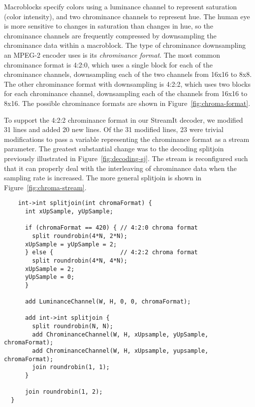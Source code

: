 
Macroblocks specify colors using a luminance channel to represent
saturation (color intensity), and two chrominance channels to
represent hue. The human eye is more sensitive to changes in
saturation than changes in hue, so the chrominance channels are
frequently compressed by downsampling the chrominance data within a
macroblock. The type of chrominance downsampling an MPEG-2 encoder
uses is its {\it chrominance format}. The most common chrominance
format is 4:2:0, which uses a single block for each of the chrominance
channels, downsampling each of the two channels from 16x16 to 8x8.
The other chrominance format with downsampling is 4:2:2, which uses
two blocks for each chrominance channel, downsampling each of the
channels from 16x16 to 8x16. The possible chrominance formats are
shown in Figure~\ref{fig:chroma-format}.

To support the 4:2:2 chrominance format in our StreamIt decoder, we
modified 31 lines and added 20 new lines. Of the 31 modified lines, 23
were trivial modifications to pass a variable representing the
chrominance format as a stream parameter. The greatest substantial
change was to the decoding splitjoin previously illustrated in
Figure~\ref{fig:decoding-sj}. The stream is reconfigured such that it
can properly deal with the interleaving of chrominance data when the
sampling rate is increased. The more general splitjoin is shown in
Figure~\ref{fig:chroma-stream}.

\begin{figure*}[t]
  \begin{scriptsize}
    \begin{verbatim}
    int->int splitjoin(int chromaFormat) {
      int xUpSample, yUpSample;

      if (chromaFormat == 420) { // 4:2:0 chroma format
        split roundrobin(4*N, 2*N);
	  xUpSample = yUpSample = 2;
      } else {                   // 4:2:2 chroma format
        split roundrobin(4*N, 4*N);
	  xUpSample = 2;
	  yUpSample = 0;
      }

      add LuminanceChannel(W, H, 0, 0, chromaFormat);

      add int->int splitjoin {
        split roundrobin(N, N);
        add ChrominanceChannel(W, H, xUpsample, yUpSample, chromaFormat);
        add ChrominanceChannel(W, H, xUpsample, yupsample, chromaFormat);
        join roundrobin(1, 1);
      }

      join roundrobin(1, 2);
  }
  \end{verbatim}
  \end{scriptsize}
  \caption{Decoding stream to handle 4:2:0 and 4:2:2 chroma formats.}
  \label{fig:chroma-stream}
\end{figure*}
